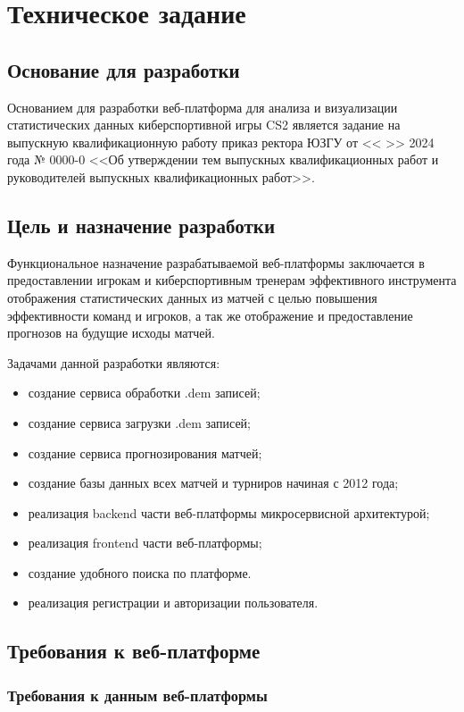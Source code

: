 \newsection
\section{Техническое задание}
\subsection{Основание для разработки}

Основанием для разработки веб-платформа для анализа и визуализации статистических данных киберспортивной игры CS2 является задание на выпускную квалификационную работу приказ ректора ЮЗГУ от <<  >>     2024 года № 0000-0 <<Об утверждении тем выпускных квалификационных работ и руководителей выпускных квалификационных работ>>.

\subsection{Цель и назначение разработки}

Функциональное назначение разрабатываемой веб-платформы заключается в предоставлении игрокам и киберспортивным тренерам эффективного инструмента отображения статистических данных из матчей с целью повышения эффективности команд и игроков, а так же отображение и предоставление прогнозов на будущие исходы матчей.

Задачами данной разработки являются:
\begin{itemize}
\item создание сервиса обработки .dem записей;
\item создание сервиса загрузки .dem записей;
\item создание сервиса прогнозирования матчей;
\item создание базы данных всех матчей и турниров начиная с 2012 года;
\item реализация backend части веб-платформы микросервисной архитектурой;
\item реализация frontend части веб-платформы;
\item создание удобного поиска по платформе.
\item реализация регистрации и авторизации пользователя.
\end{itemize}

\subsection{Требования к веб-платформе}

\subsubsection{Требования к данным веб-платформы}

